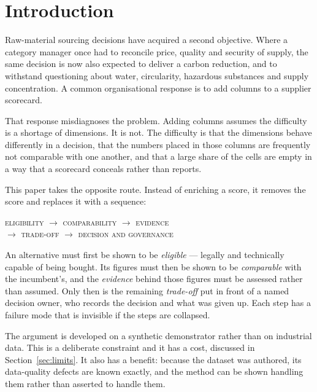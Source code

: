 \documentclass[10pt,twocolumn,a4paper]{article}
\begin{document}
{\small\tableofcontents}
\vspace{0.6em}

\section{Introduction}

Raw-material sourcing decisions have acquired a second objective. Where a
category manager once had to reconcile price, quality and security of supply, the
same decision is now also expected to deliver a carbon reduction, and to
withstand questioning about water, circularity, hazardous substances and supply
concentration. A common organisational response is to add columns to a
supplier scorecard.

That response misdiagnoses the problem. Adding columns assumes the difficulty is
a shortage of dimensions. It is not. The difficulty is that the dimensions behave
differently in a decision, that the numbers placed in those columns are frequently
not comparable with one another, and that a large share of the cells are empty in
a way that a scorecard conceals rather than reports.

This paper takes the opposite route. Instead of enriching a score, it removes the
score and replaces it with a sequence:

\begin{center}\small
\textsc{eligibility} $\rightarrow$ \textsc{comparability} $\rightarrow$ \textsc{evidence}\\
$\rightarrow$ \textsc{trade-off} $\rightarrow$ \textsc{decision and governance}
\end{center}

\noindent An alternative must first be shown to be \emph{eligible} --- legally and
technically capable of being bought. Its figures must then be shown to be
\emph{comparable} with the incumbent's, and the \emph{evidence} behind those
figures must be assessed rather than assumed. Only then is the remaining
\emph{trade-off} put in front of a named decision owner, who records the decision
and what was given up. Each step has a failure mode that is invisible if the steps
are collapsed.

The argument is developed on a synthetic demonstrator rather than on industrial
data. This is a deliberate constraint and it has a cost, discussed in
Section~\ref{sec:limits}. It also has a benefit: because the dataset was
authored, its data-quality defects are known exactly, and the method can be shown
handling them rather than asserted to handle them.
\end{document}
